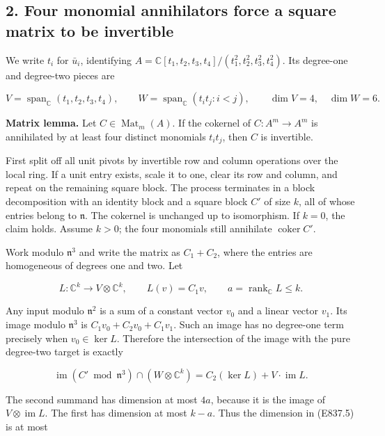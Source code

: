 \subsection{2. Four monomial annihilators force a square matrix to be
invertible}\label{four-monomial-annihilators-force-a-square-matrix-to-be-invertible}

We write \(t_i\) for \(\bar u_i\), identifying
\(A=\mathbb C[t_1,t_2,t_3,t_4]/(t_1^2,t_2^2,t_3^2,t_4^2)\). Its
degree-one and degree-two pieces are

\[
 V=\operatorname{span}_{\mathbb C}(t_1,t_2,t_3,t_4),
 \qquad W=\operatorname{span}_{\mathbb C}(t_it_j: i<j),
 \qquad \dim V=4,\quad\dim W=6.
 \tag{E837.3}
\]

\textbf{Matrix lemma.} Let \(C\in\operatorname{Mat}_m(A)\). If the
cokernel of \(C:A^m\to A^m\) is annihilated by at least four distinct
monomials \(t_it_j\), then \(C\) is invertible.

First split off all unit pivots by invertible row and column operations
over the local ring. If a unit entry exists, scale it to one, clear its
row and column, and repeat on the remaining square block. The process
terminates in a block decomposition with an identity block and a square
block \(C'\) of size \(k\), all of whose entries belong to
\(\mathfrak n\). The cokernel is unchanged up to isomorphism. If
\(k=0\), the claim holds. Assume \(k>0\); the four monomials still
annihilate \(\operatorname{coker}C'\).

Work modulo \(\mathfrak n^3\) and write the matrix as \(C_1+C_2\), where
the entries are homogeneous of degrees one and two. Let

\[
 L:\mathbb C^k\longrightarrow V\otimes\mathbb C^k,
 \qquad L(v)=C_1v,
 \qquad a=\operatorname{rank}_{\mathbb C}L\le k.
 \tag{E837.4}
\]

Any input modulo \(\mathfrak n^2\) is a sum of a constant vector \(v_0\)
and a linear vector \(v_1\). Its image modulo \(\mathfrak n^3\) is
\(C_1v_0+C_2v_0+C_1v_1\). Such an image has no degree-one term precisely
when \(v_0\in\ker L\). Therefore the intersection of the image with the
pure degree-two target is exactly

\[
 \operatorname{im}(C'\bmod\mathfrak n^3)
       \cap(W\otimes\mathbb C^k)
     = C_2(\ker L)+ V\cdot\operatorname{im}L.
 \tag{E837.5}
\]

The second summand has dimension at most \(4a\), because it is the image
of \(V\otimes\operatorname{im}L\). The first has dimension at most
\(k-a\). Thus the dimension in (E837.5) is at most

